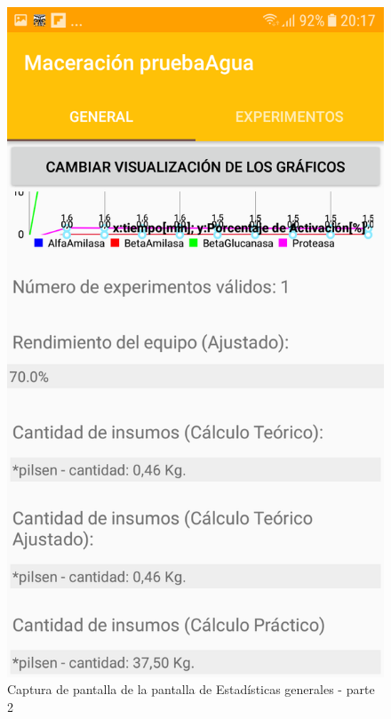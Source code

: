             \begin{figure}[h]
                \centering
                \includegraphics[scale=0.2]{software/ScreenCapture/GeneralStatistics-p2.jpg}
                \caption{Captura de pantalla de la pantalla de Estadísticas generales - parte 2}
                \label{fig:CapturaGeneralFrag-P2}
            \end{figure}
            
